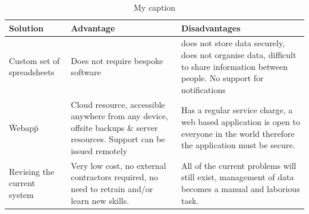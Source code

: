 \begin{table}[]
\centering
\caption{My caption}
\label{my-label}
\begin{tabular}{|l|l|l|}
\hline
Solution                       & Advantage                                                                                                                                                                                                                                                                     & Disadvantages                                                                                                                                                                                                                                              \\ \hline
Custom set of spreadsheets     & Does not require bespoke software                                                                                                                                                                                                                                             & does not store data securely, does not organise data, difficult to share information between people. No support for notifications                                                                                                                          \\ \hline
\"Webapp\"                       & Cloud resource, accessible anywhere from any device, offsite backups \& server resources. Support can be issued remotely                                                                                                                                                      & Has a regular service charge, a web based application is open to everyone in the world therefore the application must be secure.                                                                                                                           \\ \hline
Revising the current system    & Very low cost, no external contractors required, no need to retrain and/or learn new skills.                                                                                                                                                                                  & All of the current problems will still exist, management of data becomes a manual and laborious task.                                                                                                                                                      \\ \hline

\end{tabular}
\end{table}
